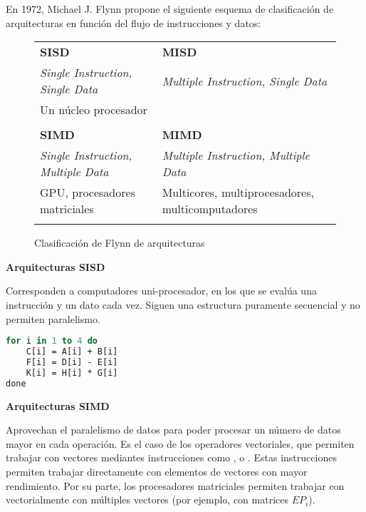 En 1972, Michael J. Flynn propone el siguiente esquema de clasificación de arquitecturas en función del flujo de instrucciones y datos:

\begin{figure}
\begin{center}
\begin{tabular}{C{6.5cm} | C{6.5cm}}
\textbf{SISD}                              & \textbf{MISD}                                    \\
\textit{Single Instruction, Single Data}   & \textit{Multiple Instruction, Single Data}       \\
Un núcleo procesador                       &                                                  \\
                     &                            \\
\hline
\textbf{SIMD}                              & \textbf{MIMD}                                    \\
\textit{Single Instruction, Multiple Data} & \textit{Multiple Instruction, Multiple Data}     \\
GPU, procesadores matriciales              & Multicores, multiprocesadores, multicomputadores \\
                     &                            \\
\end{tabular}
\end{center}
\caption{Clasificación de Flynn de arquitecturas}
\end{figure}

\pagebreak

\textbf{Arquitecturas SISD}

Corresponden a computadores uni-procesador, en los que se evalúa una instrucción y un dato cada vez.
Siguen una estructura puramente secuencial y no permiten paralelismo.

\begin{lstlisting}[language=Pascal]
for i in 1 to 4 do
	C[i] = A[i] + B[i]
	F[i] = D[i] - E[i]
	K[i] = H[i] * G[i]
done
\end{lstlisting}

\textbf{Arquitecturas SIMD}

Aprovechan el paralelismo de datos para poder procesar un número de datos mayor en cada operación.
Es el caso de los operadores vectoriales, que permiten trabajar con vectores mediantes instrucciones como ,  o .
Estas instrucciones permiten trabajar directamente con elementos de vectores con mayor rendimiento.
Por su parte, los procesadores matriciales permiten trabajar con vectorialmente con múltiples vectores (por ejemplo, con matrices $EP_i$).

